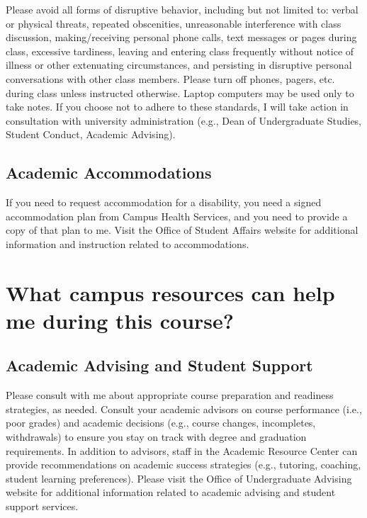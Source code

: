 \documentclass[11pt]{article}
\begin{document}
Please avoid all forms of disruptive behavior, including but not limited to: verbal or physical threats, repeated obscenities, unreasonable interference with class discussion, making/receiving personal phone calls, text messages or pages during class, excessive tardiness, leaving and entering class frequently without notice of illness or other extenuating circumstances, and persisting in disruptive personal conversations with other class members.  Please turn off phones, pagers, etc. during class unless instructed otherwise.  Laptop computers may be used only to take notes. If you choose not to adhere to these standards, I will take action in consultation with university administration (e.g., Dean of Undergraduate Studies, Student Conduct, Academic Advising).

\subsection{Academic Accommodations}

If you need to request accommodation for a disability, you need a signed accommodation plan from Campus Health Services, and you need to provide a copy of that plan to me. Visit the Office of Student Affairs website for additional information and instruction related to accommodations. 



\section{What campus resources can help me during this course?}

\subsection{Academic Advising and Student Support}
Please consult with me about appropriate course preparation and readiness strategies, as needed.  Consult your academic advisors on course performance (i.e., poor grades) and academic decisions (e.g., course changes, incompletes, withdrawals) to ensure you stay on track with degree and graduation requirements. In addition to advisors, staff in the Academic Resource Center can provide recommendations on academic success strategies (e.g., tutoring, coaching, student learning preferences).  Please visit the Office of Undergraduate Advising website for additional information related to academic advising and student support services. 
\end{document}
